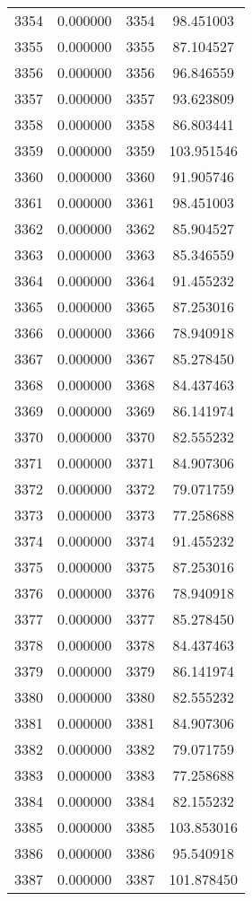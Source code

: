 \documentclass[12pt]{article}
\begin{document}
\begin{longtable}{@{}cccc@{}}
3354 & 0.000000 & 3354 & 98.451003 \\
3355 & 0.000000 & 3355 & 87.104527 \\
3356 & 0.000000 & 3356 & 96.846559 \\
3357 & 0.000000 & 3357 & 93.623809 \\
3358 & 0.000000 & 3358 & 86.803441 \\
3359 & 0.000000 & 3359 & 103.951546 \\
3360 & 0.000000 & 3360 & 91.905746 \\
3361 & 0.000000 & 3361 & 98.451003 \\
3362 & 0.000000 & 3362 & 85.904527 \\
3363 & 0.000000 & 3363 & 85.346559 \\
3364 & 0.000000 & 3364 & 91.455232 \\
3365 & 0.000000 & 3365 & 87.253016 \\
3366 & 0.000000 & 3366 & 78.940918 \\
3367 & 0.000000 & 3367 & 85.278450 \\
3368 & 0.000000 & 3368 & 84.437463 \\
3369 & 0.000000 & 3369 & 86.141974 \\
3370 & 0.000000 & 3370 & 82.555232 \\
3371 & 0.000000 & 3371 & 84.907306 \\
3372 & 0.000000 & 3372 & 79.071759 \\
3373 & 0.000000 & 3373 & 77.258688 \\
3374 & 0.000000 & 3374 & 91.455232 \\
3375 & 0.000000 & 3375 & 87.253016 \\
3376 & 0.000000 & 3376 & 78.940918 \\
3377 & 0.000000 & 3377 & 85.278450 \\
3378 & 0.000000 & 3378 & 84.437463 \\
3379 & 0.000000 & 3379 & 86.141974 \\
3380 & 0.000000 & 3380 & 82.555232 \\
3381 & 0.000000 & 3381 & 84.907306 \\
3382 & 0.000000 & 3382 & 79.071759 \\
3383 & 0.000000 & 3383 & 77.258688 \\
3384 & 0.000000 & 3384 & 82.155232 \\
3385 & 0.000000 & 3385 & 103.853016 \\
3386 & 0.000000 & 3386 & 95.540918 \\
3387 & 0.000000 & 3387 & 101.878450 \\

\end{longtable}
\end{document}
